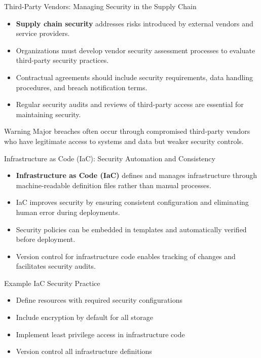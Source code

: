\documentclass{beamer}
\begin{document}
    \begin{frame}{Third-Party Vendors: Managing Security in the Supply Chain}
    \begin{itemize}
    \item \textbf{Supply chain security} addresses risks introduced by external vendors and service providers.
    \item Organizations must develop vendor security assessment processes to evaluate third-party security practices.
    \item Contractual agreements should include security requirements, data handling procedures, and breach notification terms.
    \item Regular security audits and reviews of third-party access are essential for maintaining security.
    \end{itemize}
    
    \begin{alertblock}{Warning}
    Major breaches often occur through compromised third-party vendors who have legitimate access to systems and data but weaker security controls.
    \end{alertblock}
    \end{frame}
    
    \begin{frame}{Infrastructure as Code (IaC): Security Automation and Consistency}
    \begin{itemize}
    \item \textbf{Infrastructure as Code (IaC)} defines and manages infrastructure through machine-readable definition files rather than manual processes.
    \item IaC improves security by ensuring consistent configuration and eliminating human error during deployments.
    \item Security policies can be embedded in templates and automatically verified before deployment.
    \item Version control for infrastructure code enables tracking of changes and facilitates security audits.
    \end{itemize}
    
    \begin{exampleblock}{Example IaC Security Practice}
    \begin{itemize}
    \item Define resources with required security configurations
    \item Include encryption by default for all storage 
    \item Implement least privilege access in infrastructure code
    \item Version control all infrastructure definitions
    \end{itemize}
    \end{exampleblock}
    \end{frame}
\end{document}
